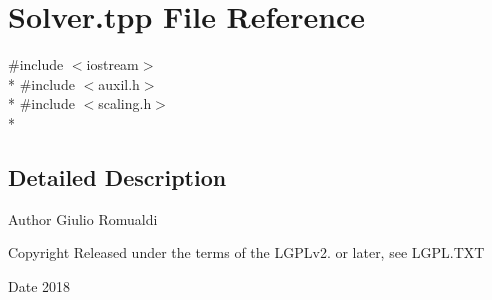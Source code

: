 \section{Solver.\+tpp File Reference}
\label{Solver_8tpp}
{\ttfamily \#include $<$iostream$>$}\\*
{\ttfamily \#include $<$auxil.\+h$>$}\\*
{\ttfamily \#include $<$scaling.\+h$>$}\\*


\subsection{Detailed Description}
\begin{DoxyAuthor}{Author}
Giulio Romualdi 
\end{DoxyAuthor}
\begin{DoxyCopyright}{Copyright}
Released under the terms of the L\+G\+P\+Lv2. or later, see L\+G\+P\+L.\+T\+XT 
\end{DoxyCopyright}
\begin{DoxyDate}{Date}
2018 
\end{DoxyDate}
